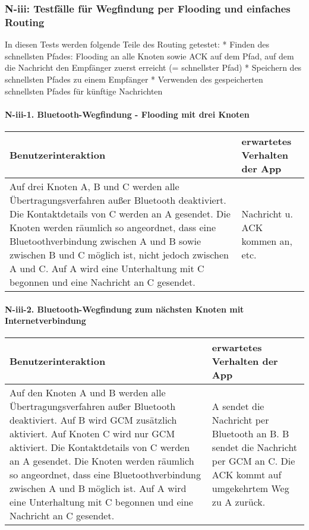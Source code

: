 
\clearpage
\subsubsection{N-iii: Testfälle für Wegfindung per Flooding und einfaches
Routing}\label{iii-testfuxe4lle-fuxfcr-wegfindung-per-flooding-und-einfaches-routing}

In diesen Tests werden folgende Teile des Routing getestet: * Finden des
schnellsten Pfades: Flooding an alle Knoten sowie ACK auf dem Pfad, auf
dem die Nachricht den Empfänger zuerst erreicht (= schnellster Pfad) *
Speichern des schnellsten Pfades zu einem Empfänger * Verwenden des
gespeicherten schnellsten Pfades für künftige Nachrichten

\paragraph{N-iii-1. Bluetooth-Wegfindung - Flooding mit drei
Knoten}\label{bluetooth-wegfindung---flooding-mit-drei-knoten}

\begin{longtable}{p{8cm}p{8.5cm}}
\toprule
Benutzerinteraktion & erwartetes Verhalten der App\tabularnewline
\midrule
\endhead
Auf drei Knoten A, B und C werden alle Übertragungsverfahren außer
Bluetooth deaktiviert. Die Kontaktdetails von C werden an A gesendet.
Die Knoten werden räumlich so angeordnet, dass eine Bluetoothverbindung
zwischen A und B sowie zwischen B und C möglich ist, nicht jedoch
zwischen A und C. Auf A wird eine Unterhaltung mit C begonnen und eine
Nachricht an C gesendet. & Nachricht u. ACK kommen an,
etc.\tabularnewline
\bottomrule
\end{longtable}

\paragraph{N-iii-2. Bluetooth-Wegfindung zum nächsten Knoten mit
Internetverbindung}\label{bluetooth-wegfindung-zum-nuxe4chsten-knoten-mit-internetverbindung}

\begin{longtable}{p{8cm}p{8.5cm}}
\toprule
Benutzerinteraktion & erwartetes Verhalten der App\tabularnewline
\midrule
\endhead
Auf den Knoten A und B werden alle Übertragungsverfahren außer Bluetooth deaktiviert. 
Auf B wird GCM zusätzlich aktiviert. Auf Knoten C wird nur GCM aktiviert. 
Die Kontaktdetails von C werden an A gesendet. 
Die Knoten werden räumlich so angeordnet, dass eine Bluetoothverbindung zwischen A und B möglich ist. 
Auf A wird eine Unterhaltung mit C begonnen und eine Nachricht an C gesendet.
& A sendet die Nachricht per Bluetooth an B.
B sendet die Nachricht per GCM an C. 
Die ACK kommt auf umgekehrtem Weg zu A zurück.\tabularnewline
\bottomrule
\end{longtable}

